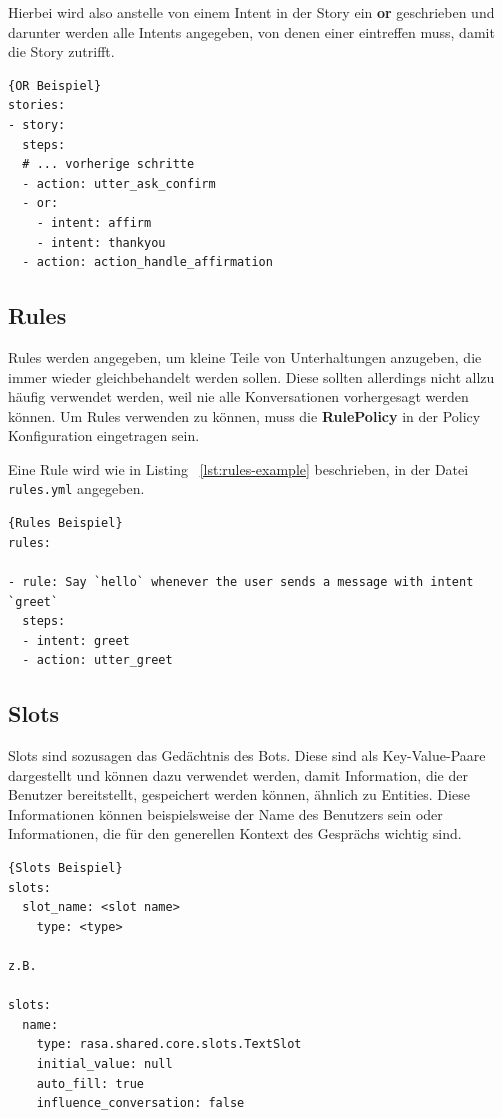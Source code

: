 Hierbei wird also anstelle von einem Intent in der Story ein \textbf{or} geschrieben und darunter werden alle Intents angegeben, von denen einer eintreffen muss, damit die Story zutrifft.

\begin{lstlisting}[label={lst:or-example},caption={OR Beispiel}]{OR Beispiel}
stories:
- story:
  steps:
  # ... vorherige schritte
  - action: utter_ask_confirm
  - or:
    - intent: affirm
    - intent: thankyou
  - action: action_handle_affirmation
\end{lstlisting}

\subsection{Rules}\label{subsec:Rules}

Rules werden angegeben, um kleine Teile von Unterhaltungen anzugeben, die immer wieder gleichbehandelt werden sollen.
Diese sollten allerdings nicht allzu häufig verwendet werden, weil nie alle Konversationen vorhergesagt werden können.
Um Rules verwenden zu können, muss die \textbf{RulePolicy} in der Policy Konfiguration eingetragen sein.\cite{rules}

Eine Rule wird wie in Listing ~\ref{lst:rules-example} beschrieben, in der Datei \texttt{rules.yml} angegeben.

\begin{lstlisting}[label={lst:rules-example},caption={Rules Beispiel}]{Rules Beispiel}
rules:

- rule: Say `hello` whenever the user sends a message with intent `greet`
  steps:
  - intent: greet
  - action: utter_greet
\end{lstlisting}

\subsection{Slots}\label{subsec:slots}

Slots sind sozusagen das Gedächtnis des Bots.
Diese sind als Key-Value-Paare dargestellt und können dazu verwendet werden, damit Information, die der Benutzer bereitstellt, gespeichert werden können, ähnlich zu Entities.
Diese Informationen können beispielsweise der Name des Benutzers sein oder Informationen, die für den generellen Kontext des Gesprächs wichtig sind.\cite{slots}

\begin{lstlisting}[label={lst:slots-example},caption={Slots Beispiel}]{Slots Beispiel}
slots:
  slot_name: <slot name>
    type: <type>

z.B.

slots:
  name:
    type: rasa.shared.core.slots.TextSlot
    initial_value: null
    auto_fill: true
    influence_conversation: false
\end{lstlisting}

